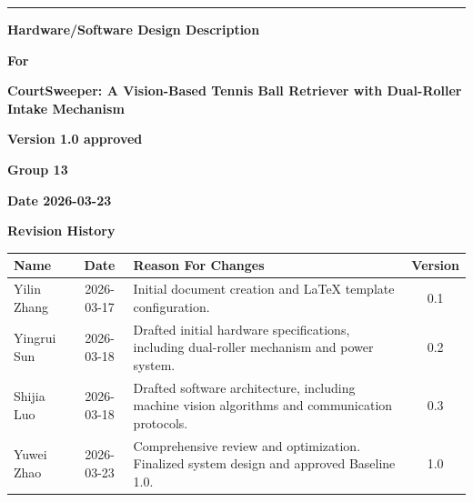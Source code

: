 \documentclass[12pt,a4paper]{article}
\begin{document}
\begin{titlepage}
\raggedleft
\rule{\linewidth}{3pt}

\vspace{1.5cm}

{\LARGE\bfseries Hardware/Software Design Description\par}

\vspace{1.5cm}

{\Large\bfseries For\par}

\vspace{1.5cm}

{\Huge\bfseries CourtSweeper: A Vision-Based Tennis Ball Retriever with Dual-Roller Intake Mechanism \par}

\vspace{1.5cm}

{\bfseries Version 1.0 approved} \\ [0.8cm]

\vspace{1.5cm}

{\bfseries Group 13} \\ [0.8cm]

\vspace{1.5cm}

{\bfseries Date 2026-03-23} \\ [3cm]
\end{titlepage}

\thispagestyle{nofooter}

\begin{center}
  \Large\bfseries
  Revision History
\end{center}

\begin{tabularx}{0.9\textwidth}{|X|c|X|c|}
  \hline
  \rowcolor[RGB]{180,180,180}
  \textbf{Name} & \textbf{Date} & \textbf{Reason For Changes} & \textbf{Version} \\ \hline

  Yilin Zhang & 2026-03-17 & Initial document creation and LaTeX template configuration. & 0.1 \\ \hline
  Yingrui Sun & 2026-03-18 & Drafted initial hardware specifications, including dual-roller mechanism and power system. & 0.2 \\ \hline
  Shijia Luo & 2026-03-18 & Drafted software architecture, including machine vision algorithms and communication protocols. & 0.3 \\ \hline
  Yuwei Zhao & 2026-03-23 & Comprehensive review and optimization. Finalized system design and approved Baseline 1.0. & 1.0 \\ \hline
\end{tabularx}

\clearpage

{
\hypersetup{linkcolor=black}
\tableofcontents
}
\thispagestyle{empty}

\clearpage

\setcounter{page}{1}





\end{document}
